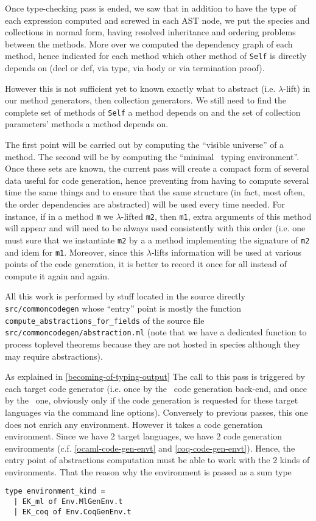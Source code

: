 Once type-checking pass is ended, we saw that in addition to have the
type of each expression computed and screwed in each AST node, we put
the species and collections in normal form, having resolved
inheritance and ordering problems between the methods. More over we
computed the dependency graph of each method, hence indicated for each
method which other method of {\tt Self} is directly depends on (decl
or def, via type, via body or via termination proof).

However this is not sufficient yet to known exactly what to abstract
(i.e. $\lambda$-lift) in our method generators, then collection
generators. We still need to find the complete set of methods of
{\tt Self} a method depends on and the set of collection parameters'
methods a method depends on.

The first point will be carried out by computing the ``visible
universe'' of a method. The second will be by computing the ``minimal
\coq\ typing environment''. Once these sets are known, the current
pass will create a compact form of several data useful for code
generation, hence preventing from having to compute several time the
same things and to ensure that the same structure (in fact, most
often, the order dependencies are abstracted) will be used every time
needed. For instance, if in a method {\tt m} we $\lambda$-lifted
{\tt m2}, then {\tt m1}, extra arguments of this method will appear
and will need to be always used consistently with this order (i.e. one
must sure that we instantiate {\tt m2} by a a method implementing the
signature of {\tt m2} and idem for {\tt m1}. Moreover, since this
$\lambda$-lifts information will be used at various points of the code
generation, it is better to record it once for all instead of compute
it again and again.

All this work is performed by stuff located in the source directly
{\tt src/commoncodegen} whose ``entry'' point is mostly the function
{\tt compute\_abstractions\_for\_fields} of the source file
{\tt src/commoncodegen/abstraction.ml} (note that we have a dedicated
function to process toplevel theorems because they are not hosted in
species although they may require abstractions).

As explained in \ref{becoming-of-typing-output} The call to this pass
is triggered by each target code generator (i.e. once by the
\ocaml\ code generation back-end, and once by the \coq\ one, obviously
only if the code generation is requested for these target languages
via the command line options). Conversely to previous passes, this one
does not enrich any environment. However it takes a code generation
environment. Since we have 2 target languages, we have 2 code
generation environments (c.f. \ref{ocaml-code-gen-envt} and
\ref{coq-code-gen-envt}). Hence, the entry point of abstractions
computation must be able to work with the 2 kinds of
environments. That the reason why the environment is passed as a sum
type
{\footnotesize
\begin{lstlisting}[language=MyOCaml]
type environment_kind =
  | EK_ml of Env.MlGenEnv.t
  | EK_coq of Env.CoqGenEnv.t
\end{lstlisting}
}

